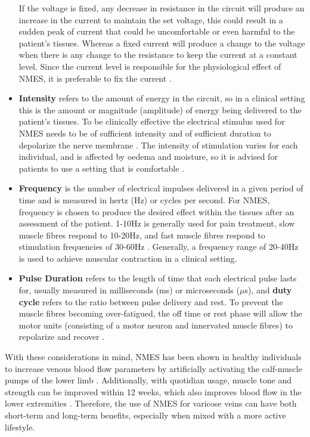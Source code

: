 \documentclass[11.5pt]{article}
\begin{document}
\begin{itemize}
    If the voltage is fixed, any decrease in resistance in the circuit will produce an increase in the current to maintain the set voltage, this could result in a sudden peak of current that could be uncomfortable or even harmful to the patient’s tissues. Whereas a fixed current will produce a change to the voltage when there is any change to the resistance to keep the current at a constant level. Since the current level is responsible for the physiological effect of NMES, it is preferable to fix the current \cite{Herbert}. 
    \item \textbf{Intensity} refers to the amount of energy in the circuit, so in a clinical setting this is the amount or magnitude (amplitude) of energy being delivered to the patient's tissues. To be clinically effective the electrical stimulus used for NMES needs to be of sufficient intensity and of sufficient duration to depolarize the nerve membrane \cite{Doucet}. The intensity of stimulation varies for each individual, and is affected by oedema and moisture, so it is advised for patients to use a setting that is comfortable \cite{Ravikumar}.
    \item \textbf{Frequency} is the number of electrical impulses delivered in a given period of time and is measured in hertz (Hz) or cycles per second. For NMES, frequency is chosen to produce the desired effect within the tissues after an assessment of the patient. 1-10Hz is generally used for pain treatment, slow muscle fibres respond to 10-20Hz, and fast muscle fibres respond to stimulation frequencies of 30-60Hz \cite{Herbert}. Generally, a frequency range of 20-40Hz is used to achieve muscular contraction in a clinical setting.
    \item \textbf{Pulse Duration} refers to the length of time that each electrical pulse lasts for, usually measured in milliseconds (ms) or microseconds ($\mu$s), and \textbf{duty cycle} refers to the ratio between pulse delivery and rest. To prevent the muscle fibres becoming over-fatigued, the off time or rest phase will allow the motor units (consisting of a motor neuron and innervated muscle fibres) to repolarize and recover \cite{Herbert}.
\end{itemize}

With these considerations in mind, NMES has been shown in healthy individuals to increase venous blood flow parameters by artificially activating the calf-muscle pumps of the lower limb \cite{Ravikumar}. Additionally, with quotidian usage, muscle tone and strength can be improved within 12 weeks, which also improves blood flow in the lower extremities \cite{Son}. Therefore, the use of NMES for varicose veins can have both short-term and long-term benefits, especially when mixed with a more active lifestyle.\\
\end{document}
